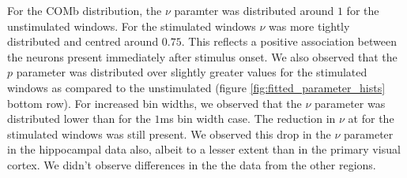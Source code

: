     For the COMb distribution, the $\nu$ paramter was distributed around $1$ for the unstimulated windows. For the stimulated windows $\nu$ was more tightly distributed and centred around $0.75$. This reflects a positive association between the neurons present immediately after stimulus onset. We also observed that the $p$ parameter was distributed over slightly greater values for the stimulated windows as compared to the unstimulated (figure \ref{fig:fitted_parameter_hists} bottom row). For increased bin widths, we observed that the $\nu$ parameter was distributed lower than for the $1$ms bin width case. The reduction in $\nu$ at for the stimulated windows was still present. We observed this drop in the $\nu$ parameter in the hippocampal data also, albeit to a lesser extent than in the primary visual cortex. We didn't observe differences in the the data from the other regions.

